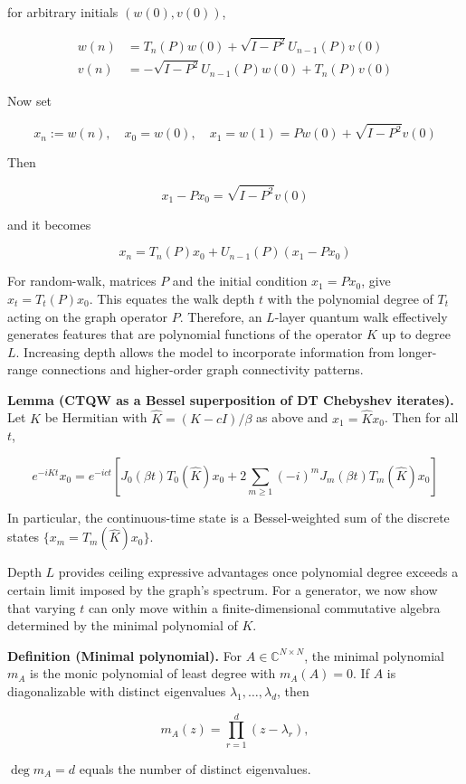 \documentclass[11pt]{article}
\begin{document}
for arbitrary initials $(w(0), v(0))$,

$$
\begin{aligned}
w(n) & =T_n(P) w(0)+\sqrt{I-P^2} U_{n-1}(P) v(0) \\
v(n) & =-\sqrt{I-P^2} U_{n-1}(P) w(0)+T_n(P) v(0)
\end{aligned}
$$

Now set

$$
x_n:=w(n), \quad x_0=w(0), \quad x_1=w(1)=P w(0)+\sqrt{I-P^2} v(0)
$$

Then

$$
x_1-P x_0=\sqrt{I-P^2} v(0)
$$

and it becomes

$$
x_n=T_n(P) x_0+U_{n-1}(P)\left(x_1-P x_0\right)
$$

For random-walk, matrices $P$ and the initial condition $x_1=Px_0$, give $x_t=T_t(P)x_0$. This equates the walk depth $t$ with the polynomial degree of $T_t$ acting on the graph operator $P$. Therefore, an $L$-layer quantum walk effectively generates features that are polynomial functions of the operator $K$ up to degree $L$. Increasing depth allows the model to incorporate information from longer-range connections and higher-order graph connectivity patterns.

\textbf{Lemma (CTQW as a Bessel superposition of DT Chebyshev iterates).} Let $K$ be Hermitian with $\widehat{K}=(K-c I) / \beta$ as above and $x_1=\widehat{K} x_0$. Then for all $t$,

$$
e^{-i K t} x_0=e^{-i c t}\left[J_0(\beta t) T_0(\widehat{K}) x_0+2 \sum_{m \geq 1}(-i)^m J_m(\beta t) T_m(\widehat{K}) x_0\right]
$$

In particular, the continuous-time state is a Bessel-weighted sum of the discrete states $\{x_m= T_m(\widehat{K}) x_0\}$. 

Depth $L$ provides ceiling expressive advantages once polynomial degree exceeds a certain limit imposed by the graph’s spectrum. For a generator, we now show that varying $t$ can only move within a finite-dimensional commutative algebra determined by the minimal polynomial of $K$.

\textbf{Definition (Minimal polynomial).} For $A\in\mathbb C^{N\times N}$, the minimal polynomial $m_A$ is the monic polynomial of least degree with $m_A(A)=0$. If $A$ is diagonalizable with distinct eigenvalues $\lambda_1,\dots,\lambda_d$, then 

$$
m_A(z)=\prod_{r=1}^d (z-\lambda_r),
$$

$\deg m_A = d$ equals the number of distinct eigenvalues. 
\end{document}
